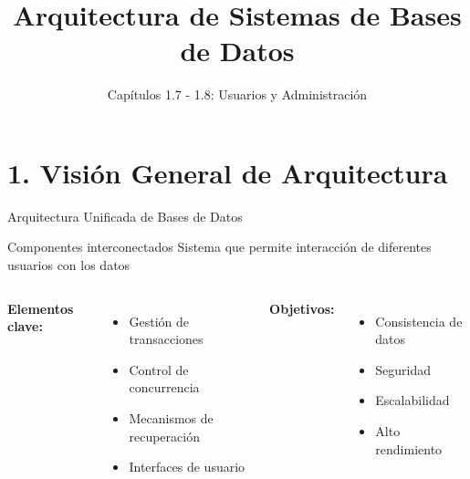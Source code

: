 \documentclass{beamer}
\title{Arquitectura de Sistemas de Bases de Datos}
\subtitle{Capítulos 1.7 - 1.8: Usuarios y Administración}
\author{}
\date{}
\begin{document}
\begin{frame}
\titlepage
\end{frame}

\section{1. Visión General de Arquitectura}
\begin{frame}{Arquitectura Unificada de Bases de Datos}
\begin{block}{Componentes interconectados}
Sistema que permite interacción de diferentes usuarios con los datos
\end{block}

\begin{columns}[T]
\textbf{Elementos clave:}
\begin{itemize}
    \item Gestión de transacciones
    \item Control de concurrencia
    \item Mecanismos de recuperación
    \item Interfaces de usuario
\end{itemize}

\textbf{Objetivos:}
\begin{itemize}
    \item Consistencia de datos
    \item Seguridad
    \item Escalabilidad
    \item Alto rendimiento
\end{itemize}
\end{columns}

\begin{center}
\end{center}
\end{frame}
\end{document}
